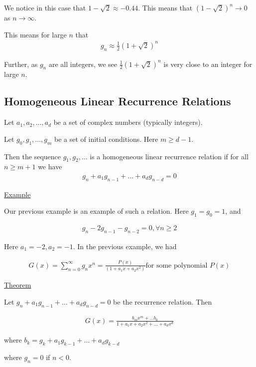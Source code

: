 \documentclass{article}
\begin{document}
We notice in this case that $1-\sqrt{2} \approx -0.44$. This means that $(1-\sqrt{2})^n \to 0$ as $n \to \infty$. 

This means for large $n$ that
\begin{align*}
    g_n \approx \frac{1}{2}(1+\sqrt{2})^n
\end{align*}

Further, as $g_n$ are all integers, we see $\frac{1}{2}(1+\sqrt{2})^n$ is very close to an integer for large $n$. 

\subsection{Homogeneous Linear Recurrence Relations}

Let $a_1, a_2, \ldots, a_d$ be a set of complex numbers (typically integers). 

Let $g_0, g_1, \ldots, g_m$ be a set of initial conditions. Here $m \ge d-1$.

Then the sequence $g_1, g_2, \ldots$ is a homogeneous linear recurrence relation if for all $n \ge m+1$ we have 
\begin{align*}
    g_n + a_1g_{n-1} + \ldots + a_d g_{n-d} = 0
\end{align*}

\underline{Example}

Our previous example is an example of such a relation. Here $g_1 = g_0 = 1$, and 

\begin{align*}
    g_n - 2g_{n-1}-g_{n-2} = 0, \forall n \ge 2
\end{align*}

Here $a_1 = -2, a_2 = -1$. In the previous example, we had 

\begin{align*}
    G(x) = \sum_{n=0}^{\infty}g_n x^n = \frac{P(x)}{(1+a_1x+a_2x^2)} \text{for some polynomial } P(x)
\end{align*}

\underline{Theorem}

Let $g_n + a_1 g_{n-1} + \ldots + a_dg_{n-d} = 0$ be the recurrence relation. Then

\begin{align*}
    G(x) = \frac{b_mx^m + \ldots b_0}{1 + a_1x+a_2x^2 + \ldots + a_dx^d}
\end{align*}

where $b_k = g_k + a_1g_{k-1} + \ldots + a_dg_{k-d}$ 

where $g_n = 0$ if $n < 0$.
\end{document}
